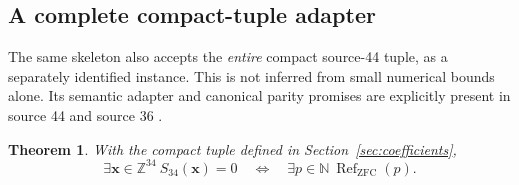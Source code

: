 \documentclass[11pt,a4paper]{article}
\newtheorem{theorem}{Theorem}[section]
\theoremstyle{definition}
\newcommand{\Z}{\mathbb Z}
\newcommand{\N}{\mathbb N}
\newcommand{\ZFCRef}{\operatorname{Ref}_{\mathrm{ZFC}}}
\begin{document}
\subsection{A complete compact-tuple adapter}
\label{subsec:compact-adapter}

The same skeleton also accepts the \emph{entire} compact
source-44 tuple, as a separately identified instance. This is
not inferred from small numerical bounds alone. Its semantic
adapter and canonical parity promises are explicitly present
in source 44 and source 36 \cite{compact,parity}.

\begin{theorem}
With the compact tuple defined in Section~\ref{sec:coefficients},
\[
 \exists\mathbf x\in\Z^{34}\ S_{34}(\mathbf x)=0
 \quad\Longleftrightarrow\quad
 \exists p\in\N\ \ZFCRef(p).
\]
\end{theorem}
\end{document}
